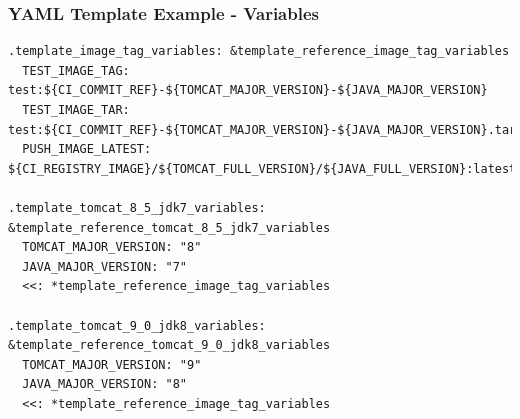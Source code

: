 \documentclass[14pt,aspectratio=169]{beamer}
\begin{document}
\begin{frame}[fragile]
  \frametitle{YAML Template Example - Variables}
  \begin{verbatim}
.template_image_tag_variables: &template_reference_image_tag_variables
  TEST_IMAGE_TAG: test:${CI_COMMIT_REF}-${TOMCAT_MAJOR_VERSION}-${JAVA_MAJOR_VERSION}
  TEST_IMAGE_TAR: test:${CI_COMMIT_REF}-${TOMCAT_MAJOR_VERSION}-${JAVA_MAJOR_VERSION}.tar
  PUSH_IMAGE_LATEST: ${CI_REGISTRY_IMAGE}/${TOMCAT_FULL_VERSION}/${JAVA_FULL_VERSION}:latest

.template_tomcat_8_5_jdk7_variables: &template_reference_tomcat_8_5_jdk7_variables
  TOMCAT_MAJOR_VERSION: "8"
  JAVA_MAJOR_VERSION: "7"
  <<: *template_reference_image_tag_variables

.template_tomcat_9_0_jdk8_variables: &template_reference_tomcat_9_0_jdk8_variables
  TOMCAT_MAJOR_VERSION: "9"
  JAVA_MAJOR_VERSION: "8"
  <<: *template_reference_image_tag_variables
  \end{verbatim}
\end{frame}
\end{document}
